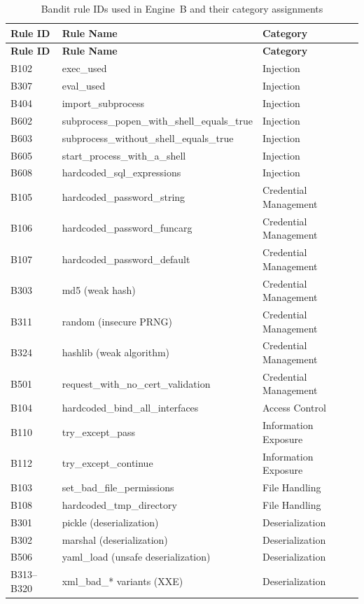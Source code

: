 \documentclass[12pt,a4paper]{report}
\begin{document}
\begin{longtable}{@{}lll@{}}
\caption{Bandit rule IDs used in Engine~B and their category assignments}
\label{tab:banditmap} \\
\toprule
\textbf{Rule ID} & \textbf{Rule Name} & \textbf{Category} \\
\midrule
\endfirsthead
\toprule
\textbf{Rule ID} & \textbf{Rule Name} & \textbf{Category} \\
\midrule
\endhead
\bottomrule
\endlastfoot
B102 & exec\_used                                  & Injection \\
B307 & eval\_used                                  & Injection \\
B404 & import\_subprocess                          & Injection \\
B602 & subprocess\_popen\_with\_shell\_equals\_true & Injection \\
B603 & subprocess\_without\_shell\_equals\_true    & Injection \\
B605 & start\_process\_with\_a\_shell              & Injection \\
B608 & hardcoded\_sql\_expressions                 & Injection \\
B105 & hardcoded\_password\_string                 & Credential Management \\
B106 & hardcoded\_password\_funcarg                & Credential Management \\
B107 & hardcoded\_password\_default                & Credential Management \\
B303 & md5 (weak hash)                             & Credential Management \\
B311 & random (insecure PRNG)                      & Credential Management \\
B324 & hashlib (weak algorithm)                    & Credential Management \\
B501 & request\_with\_no\_cert\_validation         & Credential Management \\
B104 & hardcoded\_bind\_all\_interfaces            & Access Control \\
B110 & try\_except\_pass                           & Information Exposure \\
B112 & try\_except\_continue                       & Information Exposure \\
B103 & set\_bad\_file\_permissions                 & File Handling \\
B108 & hardcoded\_tmp\_directory                   & File Handling \\
B301 & pickle (deserialization)                    & Deserialization \\
B302 & marshal (deserialization)                   & Deserialization \\
B506 & yaml\_load (unsafe deserialization)         & Deserialization \\
B313--B320 & xml\_bad\_* variants (XXE)            & Deserialization \\
\end{longtable}
\end{document}

